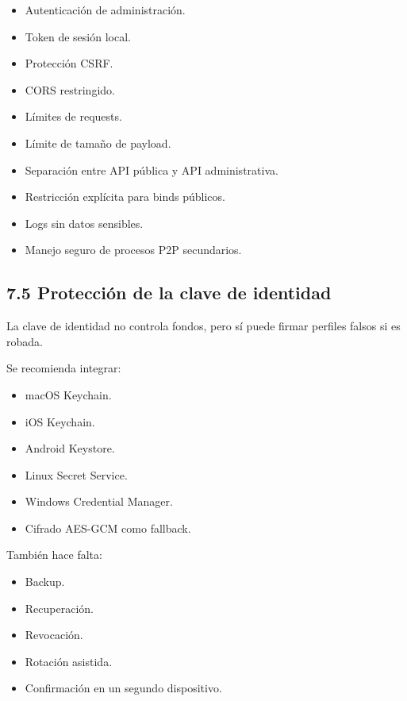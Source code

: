 \documentclass[
]{article}
\providecommand{\tightlist}{%
  \setlength{\itemsep}{0pt}\setlength{\parskip}{0pt}}
\begin{document}
\begin{itemize}
\tightlist
\item
  Autenticación de administración.
\item
  Token de sesión local.
\item
  Protección CSRF.
\item
  CORS restringido.
\item
  Límites de requests.
\item
  Límite de tamaño de payload.
\item
  Separación entre API pública y API administrativa.
\item
  Restricción explícita para binds públicos.
\item
  Logs sin datos sensibles.
\item
  Manejo seguro de procesos P2P secundarios.
\end{itemize}

\hypertarget{protecciuxf3n-de-la-clave-de-identidad}{%
\subsection{7.5 Protección de la clave de
identidad}\label{protecciuxf3n-de-la-clave-de-identidad}}

La clave de identidad no controla fondos, pero sí puede firmar perfiles
falsos si es robada.

Se recomienda integrar:

\begin{itemize}
\tightlist
\item
  macOS Keychain.
\item
  iOS Keychain.
\item
  Android Keystore.
\item
  Linux Secret Service.
\item
  Windows Credential Manager.
\item
  Cifrado AES-GCM como fallback.
\end{itemize}

También hace falta:

\begin{itemize}
\tightlist
\item
  Backup.
\item
  Recuperación.
\item
  Revocación.
\item
  Rotación asistida.
\item
  Confirmación en un segundo dispositivo.
\end{itemize}
\end{document}
